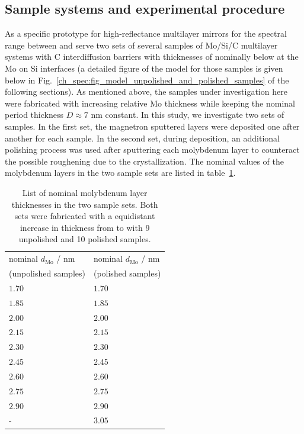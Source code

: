 \subsection{Sample systems and experimental procedure}
As a specific prototype for high-reflectance multilayer mirrors for the spectral range between  and  serve two sets of several samples of Mo/Si/C multilayer systems with C interdiffusion barriers with thicknesses of nominally below  at the Mo on Si interfaces (a detailed figure of the model for those samples is given below in Fig.~\ref{ch_spec:fig_model_unpolished_and_polished_samples} of the following sections). As mentioned above, the samples under investigation here were fabricated with increasing relative Mo thickness while keeping the nominal period thickness $D\approx 7$ nm constant. In this study, we investigate two sets of samples. In the first set, the magnetron sputtered layers were deposited one after another for each sample. In the second set, during deposition, an additional polishing process was used after sputtering each molybdenum layer to counteract the possible roughening due to the crystallization. The nominal values of the molybdenum layers in the two sample sets are listed in table~\ref{ch_spec:tbl_mo_si_thickness_nominal}.
\begin{table}[htbp]
\centering
\caption{List of nominal molybdenum layer thicknesses in the two sample sets. Both sets were fabricated with a equidistant increase in thickness from  to  with 9 unpolished and 10 polished samples.}
\label{ch_spec:tbl_mo_si_thickness_nominal}
\begin{tabular}{@{}ll@{}}
\toprule
nominal $d_\text{Mo}$ / nm & nominal $d_\text{Mo}$ / nm\\ 
(unpolished samples) & (polished samples) \\
\midrule
$1.70$& $1.70$\\ 
$1.85$& $1.85$\\ 
$2.00$ & $2.00$\\ 
$2.15$ & $2.15$\\ 
$2.30$& $2.30$\\ 
$2.45$& $2.45$\\ 
$2.60$& $2.60$\\ 
$2.75$ & $2.75$\\ 
$2.90$ & $2.90$\\ 
-& $3.05$\\ 
 \bottomrule
\end{tabular}
\end{table}

